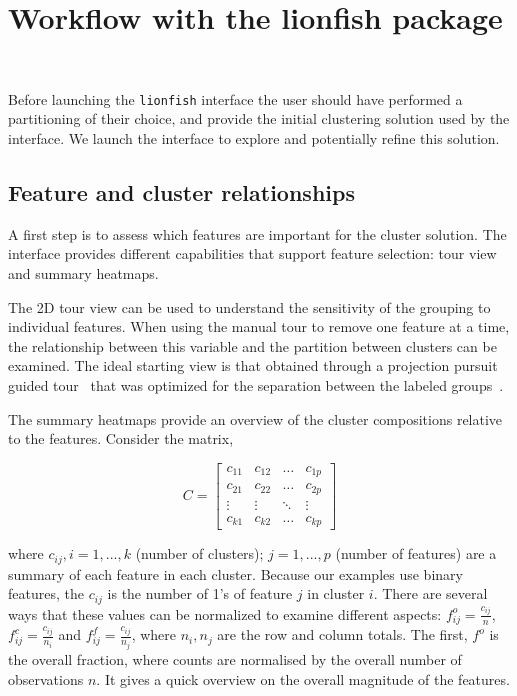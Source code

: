 \documentclass[article]{ajs}
\begin{document}
\section{Workflow with the lionfish package}~\label{workflow}

Before launching the \texttt{lionfish} interface the user should have performed a partitioning of their choice, and provide the initial clustering solution used by the interface. We launch the interface to explore and potentially refine this solution.

\subsection{Feature and cluster relationships}

A first step is to assess which features are important for the cluster solution. The interface provides different capabilities that support feature selection: tour view and summary heatmaps. 

The 2D tour view can be used to understand the sensitivity of the grouping to individual features. When using the manual tour to remove one feature at a time, the relationship between this variable and the partition between clusters can be examined. The ideal starting view is that obtained through a projection pursuit guided tour~\citep{CBCH94} that was optimized for the separation between the labeled groups~\citep{lckl2005}.

The summary heatmaps provide an overview of the cluster compositions relative to the features. Consider the matrix,

\[
C = \left[ \begin{array}{cccc} c_{11} & c_{12} & \dots & c_{1p} \\
                                              c_{21} & c_{22} & \dots & c_{2p} \\
                                              \vdots &  \vdots & \ddots &  \vdots \\
                                              c_{k1} & c_{k2} & \dots & c_{kp}
                                              \end{array} \right]
\]

where $c_{ij}, i=1, ..., k$ (number of clusters); $j=1, ..., p$ (number of features) are a summary of each feature in each cluster. Because our examples use binary features,  the $c_{ij}$ is the number of 1's of feature $j$ in cluster $i$. %
There are several ways that these values can be normalized to examine different aspects: $f_{ij}^{o} = \frac{c_{ij}}{n}$, $f_{ij}^{c} = \frac{c_{ij}}{n_{i}}$ and $f_{ij}^{f} = \frac{c_{ij}}{n_{j}}$, where $n_i, n_j$ are the row and column totals. The first, $f^{o}$ is the overall fraction, where counts are normalised by the overall number of observations $n$. It gives a quick overview on the overall magnitude of the features.
\end{document}
